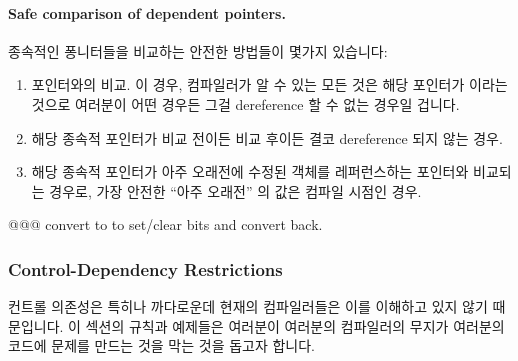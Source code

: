 \begin{enumerate}

\paragraph{Safe comparison of dependent pointers.}
종속적인 퐁니터들을 비교하는 안전한 방법들이 몇가지 있습니다:

\begin{enumerate}
\item	{} 포인터와의 비교.
	이 경우, 컴파일러가 알 수 있는 모든 것은 해당 포인터가  이라는
	것으로 여러분이 어떤 경우든 그걸 dereference 할 수 없는 경우일 겁니다.
\item	해당 종속적 포인터가 비교 전이든 비교 후이든 결코 dereference 되지 않는
	경우.
\item	해당 종속적 포인터가 아주 오래전에 수정된 객체를 레퍼런스하는 포인터와
	비교되는 경우로, 가장 안전한 ``아주 오래전'' 의 값은 컴파일 시점인
	경우.

\end{enumerate}

@@@ convert to  to set/clear bits and convert back.


\subsubsection{Control-Dependency Restrictions}
\label{sec:advsync:Control-Dependency Restrictions}

컨트롤 의존성은 특히나 까다로운데 현재의 컴파일러들은 이를 이해하고 있지 않기
때문입니다.
이 섹션의 규칙과 예제들은 여러분이 여러분의 컴파일러의 무지가 여러분의 코드에
문제를 만드는 것을 막는 것을 돕고자 합니다.


\end{enumerate}
